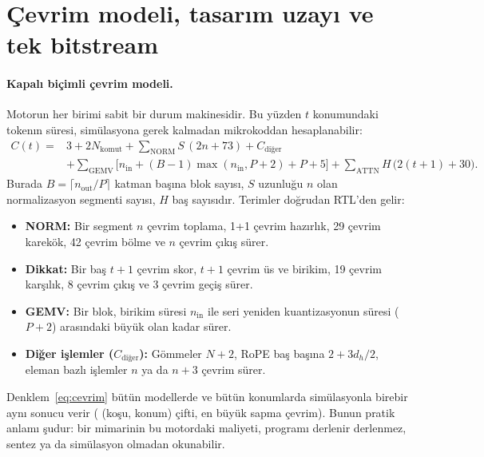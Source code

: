 \section{Çevrim modeli, tasarım uzayı ve tek bitstream}\label{sec:sistem}

\paragraph{Kapalı biçimli çevrim modeli.} Motorun her birimi sabit bir durum makinesidir. Bu yüzden $t$ konumundaki
tokenın süresi, simülasyona gerek kalmadan mikrokoddan hesaplanabilir:
\begin{equation}
\begin{aligned}
C(t) ={}& 3 + 2N_\mathrm{komut} + \textstyle\sum_\mathrm{NORM} S\,(2n + 73) + C_\mathrm{diğer}\\
&+ \textstyle\sum_\mathrm{GEMV}\big[n_\mathrm{in} + (B-1)\max(n_\mathrm{in},P{+}2) + P + 5\big]
 + \textstyle\sum_\mathrm{ATTN} H\,\big(2(t+1) + 30\big).
\end{aligned}
\label{eq:cevrim}
\end{equation}
Burada $B=\lceil n_\mathrm{out}/P\rceil$ katman başına blok sayısı, $S$ uzunluğu $n$ olan normalizasyon segmenti sayısı,
$H$ baş sayısıdır. Terimler doğrudan RTL'den gelir:
\begin{itemize}
  \item \textbf{NORM:} Bir segment $n$ çevrim toplama, 1+1 çevrim hazırlık, 29 çevrim karekök, 42 çevrim bölme ve $n$
  çevrim çıkış sürer.
  \item \textbf{Dikkat:} Bir baş $t+1$ çevrim skor, $t+1$ çevrim üs ve birikim, 19 çevrim karşılık, 8 çevrim çıkış ve
  3 çevrim geçiş sürer.
  \item \textbf{GEMV:} Bir blok, birikim süresi $n_\mathrm{in}$ ile seri yeniden kuantizasyonun süresi ($P+2$) arasındaki
  büyük olan kadar sürer.
  \item \textbf{Diğer işlemler ($C_\mathrm{diğer}$):} Gömmeler $N{+}2$, RoPE baş başına $2+3d_h/2$, eleman bazlı işlemler
  $n$ ya da $n{+}3$ çevrim sürer.
\end{itemize}
Denklem~\eqref{eq:cevrim} bütün modellerde ve bütün konumlarda simülasyonla birebir aynı sonucu verir
(\zooPerfPairs{} (koşu, konum) çifti, en büyük sapma \zooPerfMaxErr{} çevrim). Bunun pratik anlamı şudur: bir
mimarinin bu motordaki maliyeti, programı derlenir derlenmez, sentez ya da simülasyon olmadan okunabilir.

